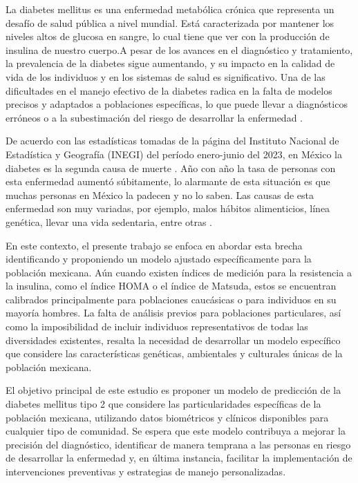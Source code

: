 

La diabetes mellitus es una enfermedad metabólica crónica que representa un desafío de salud pública a nivel mundial. Está caracterizada por mantener los niveles altos de glucosa en sangre, lo cual tiene que ver con la producción de insulina de nuestro cuerpo.A pesar de los avances en el diagnóstico y tratamiento, la prevalencia de la diabetes sigue aumentando, y su impacto en la calidad de vida de los individuos y en los sistemas de salud es significativo. Una de las dificultades en el manejo efectivo de la diabetes radica en la falta de modelos precisos y adaptados a poblaciones específicas, lo que puede llevar a diagnósticos erróneos o a la subestimación del riesgo de desarrollar la enfermedad \cite{HOMAMex}.

De acuerdo con las estadísticas tomadas de la página del Instituto Nacional de Estadística y Geografía (INEGI) del período enero-junio del 2023, en México la diabetes es la segunda causa de muerte \cite{INEGI}. Año con año la tasa de personas con esta enfermedad aumentó súbitamente, lo alarmante de esta situación es que muchas personas en México la padecen y no lo saben. Las causas de esta enfermedad son muy variadas, por ejemplo, malos hábitos alimenticios, línea genética, llevar una vida sedentaria, entre otras \cite{PromoSaludMexico}.

En este contexto, el presente trabajo se enfoca en abordar esta brecha identificando y proponiendo un modelo ajustado específicamente para la población mexicana. Aún cuando existen índices de medición para la resistencia a la insulina, como el índice HOMA o el índice de Matsuda, estos se encuentran calibrados principalmente para poblaciones caucásicas o para individuos en su mayoría hombres. La falta de análisis previos para poblaciones particulares, así como la imposibilidad de incluir individuos representativos de todas las diversidades existentes, resalta la necesidad de desarrollar un modelo específico que considere las características genéticas, ambientales y culturales únicas de la población mexicana.

El objetivo principal de este estudio es proponer un modelo de predicción de la diabetes mellitus tipo 2 que considere las particularidades específicas de la población mexicana, utilizando datos biométricos y clínicos disponibles para cualquier tipo de comunidad. Se espera que este modelo contribuya a mejorar la precisión del diagnóstico, identificar de manera temprana a las personas en riesgo de desarrollar la enfermedad y, en última instancia, facilitar la implementación de intervenciones preventivas y estrategias de manejo personalizadas.

